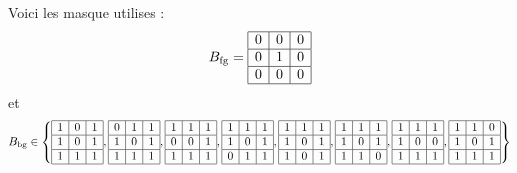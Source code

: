 \documentclass[10pt,a4paper]{article}
\begin{document}
{Voici les masque utilises : 
\begin{displaymath}
B_{\text{fg}} = 
\begin{array}{|c|c|c|}
	\hline 0  & 0  & 0   \\
	\hline 0  & 1  & 0  \\
	\hline 0  & 0  & 0  \\
	\hline
\end{array}
\end{displaymath}
et
\begin{displaymath}
B_{\text{bg}} \in\left\{ 
	\begin{array}{|c|c|c|}
	 \hline 1  & 0  & 1   \\
	 \hline 1  & 0  & 1  \\
	 \hline 1  & 1  & 1  \\
	\hline
	\end{array},
	\begin{array}{|c|c|c|}
	 \hline 0  & 1  & 1   \\
	 \hline 1  & 0  & 1  \\
	 \hline 1  & 1  & 1  \\
	\hline
	\end{array},
	\begin{array}{|c|c|c|}
	 \hline 1  & 1  & 1   \\
	 \hline 0  & 0  & 1  \\
	 \hline 1  & 1  & 1  \\
	\hline
	\end{array},
	\begin{array}{|c|c|c|}
	 \hline 1  & 1  & 1   \\
	 \hline 1  & 0  & 1  \\
	 \hline 0  & 1  & 1  \\
	\hline
	\end{array},
	\begin{array}{|c|c|c|}
	 \hline 1  & 1  & 1   \\
	 \hline 1  & 0  & 1  \\
	 \hline 1  & 0  & 1  \\
	\hline
	\end{array},
	\begin{array}{|c|c|c|}
	 \hline 1  & 1  & 1   \\
	 \hline 1  & 0  & 1  \\
	 \hline 1  & 1  & 0  \\
	\hline
	\end{array},
	\begin{array}{|c|c|c|}
	 \hline 1  & 1  & 1   \\
	 \hline 1  & 0  & 0  \\
	 \hline 1  & 1  & 1  \\
	\hline
	\end{array},
	\begin{array}{|c|c|c|}
	 \hline 1  & 1  & 0   \\
	 \hline 1  & 0  & 1  \\
	 \hline 1  & 1  & 1  \\
	\hline
	\end{array}
\right\}
\end{displaymath}

}
\end{document}
